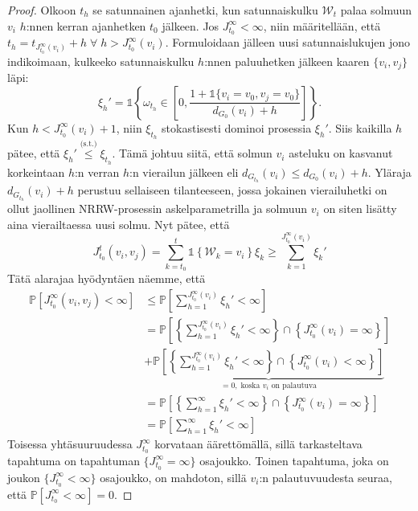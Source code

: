 \documentclass[finnish, 12pt, a4paper, sci, utf8, pdfa]{aaltothesis}
\newcommand{\Wrandom}{\mathcal{W}}
\newcommand{\indicator}{\mathopen{\mathds{1}}}
\newcommand*{\prob}{\mathbb{P}}
\begin{document}
\begin{proof}
   Olkoon $ t_{h} $ se satunnainen ajanhetki, kun satunnaiskulku $ \Wrandom_{t} $ palaa solmuun $ v_{i} $ $ h $:nnen kerran ajanhetken $ t_{0} $ jälkeen. Jos $ J_{t_{0}}^{\infty} < \infty $,
   niin määritellään, että $ t_{h} = t_{J_{t_{0}}^{\infty}(v_{i})} + h \; \forall \; h > J_{t_{0}}^{\infty}(v_{i}) $. Formuloidaan jälleen uusi satunnaislukujen jono indikoimaan, kulkeeko 
   satunnaiskulku $ h $:nnen paluuhetken jälkeen kaaren $ \{ v_{i}, v_{j} \} $ läpi:
   \[
      \xi_{h}' = \indicator \left\{ \omega_{t_{h}} \in \left[ 0, \frac{1 + \indicator \{ v_{i} = v_{0}, v_{j} = v_{0} \}}{d_{G_{0}}(v_{i}) + h} \right] \right\}.
   \]
   Kun $ h < J_{t_{0}}^{\infty}(v_{i}) + 1 $, niin $ \xi_{t_{h}} $ stokastisesti dominoi prosessia $ \xi_{h}' $. Siis kaikilla $ h $ pätee, että $ \xi_{h}' \overset{\text{(s.t.)}}{\leq} \xi_{t_{h}} $.
   Tämä johtuu siitä, että solmun $ v_{i} $ asteluku on kasvanut korkeintaan $ h $:n verran $ h $:n vierailun jälkeen eli $ d_{G_{t_{h}}}(v_{i}) \leq d_{G_{0}}(v_{i}) + h $. Yläraja
   $ d_{G_{t_{h}}}(v_{i}) + h $ perustuu sellaiseen tilanteeseen, jossa jokainen vierailuhetki on ollut jaollinen NRRW-prosessin askelparametrilla ja solmuun $ v_{i} $ on siten lisätty
   aina vierailtaessa uusi solmu. Nyt pätee, että
   \[
      J_{t_{0}}^{t}(v_{i}, v_{j}) = \sum_{k = t_{0}}^{t} \indicator \left\{ \Wrandom_{k} = v_{i} \right\} \xi_{k} \geq \sum_{k = 1}^{J_{t_{0}}^{\infty}(v_{i})} \xi_{k}'
   \]
   Tätä alarajaa hyödyntäen näemme, että
   \begin{align*}
      \prob \left[ J_{t_{0}}^{\infty}(v_{i}, v_{j}) < \infty \right] &\leq \prob \left[ \sum_{h = 1}^{J_{t_{0}}^{\infty}(v_{i})} \xi_{h}' < \infty \right] \\
         &= \prob \left[ \left\{ \sum_{h = 1}^{J_{t_{0}}^{\infty}(v_{i})} \xi_{h}' < \infty \right\} \cap \left\{ J_{t_{0}}^{\infty}(v_{i}) = \infty \right\} \right] \\
         &+ \underbrace{\prob \left[ \left\{ \sum_{h = 1}^{J_{t_{0}}^{\infty}(v_{i})} \xi_{h}' < \infty \right\} \cap \left\{ J_{t_{0}}^{\infty}(v_{i}) < \infty \right\} \right]}_{= 0, \; \text{koska } v_{i} \text{ on palautuva}} \\
         &= \prob \left[ \left\{ \sum_{h = 1}^{\infty} \xi_{h}' < \infty \right\} \cap \left\{ J_{t_{0}}^{\infty}(v_{i}) = \infty \right\} \right] \\
         &= \prob \left[ \sum_{h = 1}^{\infty} \xi_{h}' < \infty \right]
   \end{align*}
   Toisessa yhtäsuuruudessa $ J_{t_{0}}^{\infty} $ korvataan äärettömällä, sillä tarkasteltava tapahtuma on tapahtuman $ \{ J_{t_{0}}^{\infty} = \infty \} $ osajoukko. Toinen tapahtuma,
   joka on joukon $ \{ J_{t_{0}}^{\infty} < \infty \} $ osajoukko, on mahdoton, sillä $ v_{i} $:n palautuvuudesta seuraa, että $ \prob \left[ J_{t_{0}}^{\infty} < \infty \right] = 0 $.


\end{proof}
\end{document}
